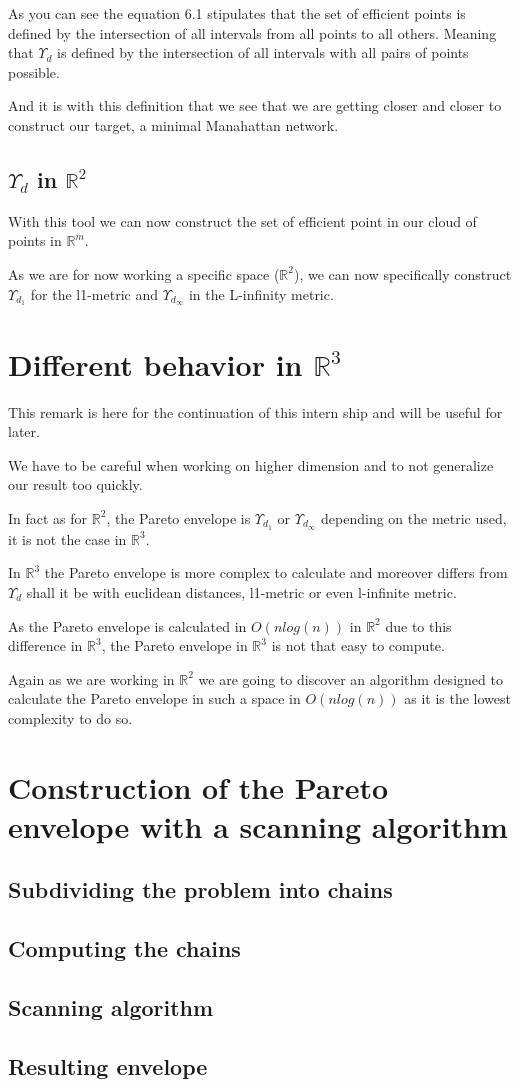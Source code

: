 As you can see the equation 6.1 stipulates that the set of efficient points is defined by the intersection of all intervals from all points to all others. Meaning that $\Upsilon_d$ is defined by the intersection of all intervals with all pairs of points possible.

And it is with this definition that we see that we are getting closer and closer to construct our target, a minimal Manahattan network.

\subsection{$\Upsilon_d$ in $\mathbb{R}^2$}%
With this tool we can now construct the set of efficient point in our cloud of points in $\mathbb{R}^m$.

As we are for now working a specific space ($\mathbb{R}^2$), we can now specifically construct $\Upsilon_{d_1}$ for the l1-metric and $\Upsilon_{d_{\infty}}$ in the L-infinity metric.

\section{Different behavior in $\mathbb{R}^3$}%
This remark is here for the continuation of this intern ship and will be useful for later. 

We have to be careful when working on higher dimension and to not generalize our result too quickly.

In fact as for $\mathbb{R}^2$, the Pareto envelope is $\Upsilon_{d_1}$ or $\Upsilon_{d_\infty}$ depending on the metric used, it is not the case in $\mathbb{R}^3$.

In $\mathbb{R}^3$ the Pareto envelope is more complex to calculate and moreover differs from $\Upsilon_d$ shall it be with euclidean distances, l1-metric or even l-infinite metric.

As the Pareto envelope is calculated in $O(n log(n))$ in $\mathbb{R}^2$ due to this difference in $\mathbb{R}^3$, the Pareto envelope in $\mathbb{R}^3$ is not that easy to compute.

Again as we are working in $\mathbb{R}^2$ we are going to discover an algorithm designed to calculate the Pareto envelope in such a space in $O(nlog(n))$ as it is the lowest complexity to do so.

\section{Construction of the Pareto envelope with a scanning algorithm}%
\subsection{Subdividing the problem into chains}
\subsection{Computing the chains}
\subsection{Scanning algorithm}
\subsection{Resulting envelope}